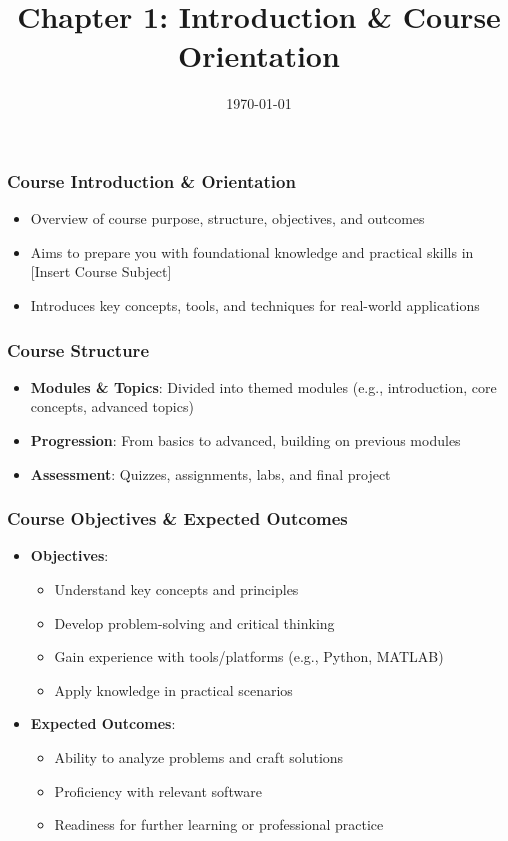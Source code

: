 \documentclass{beamer}
\title{Chapter 1: Introduction \& Course Orientation}
\author{}
\institute{}
\date{\today}
\begin{document}
\frame{\titlepage}

\begin{frame}[fragile]
  \frametitle{Course Introduction \& Orientation}
  \begin{itemize}
    \item Overview of course purpose, structure, objectives, and outcomes
    \item Aims to prepare you with foundational knowledge and practical skills in [Insert Course Subject]
    \item Introduces key concepts, tools, and techniques for real-world applications
  \end{itemize}
\end{frame}

\begin{frame}[fragile]
  \frametitle{Course Structure}
  \begin{itemize}
    \item \textbf{Modules \& Topics}: Divided into themed modules (e.g., introduction, core concepts, advanced topics)
    \item \textbf{Progression}: From basics to advanced, building on previous modules
    \item \textbf{Assessment}: Quizzes, assignments, labs, and final project
  \end{itemize}
\end{frame}

\begin{frame}[fragile]
  \frametitle{Course Objectives \& Expected Outcomes}
  \begin{itemize}
    \item \textbf{Objectives}: 
      \begin{itemize}
        \item Understand key concepts and principles
        \item Develop problem-solving and critical thinking
        \item Gain experience with tools/platforms (e.g., Python, MATLAB)
        \item Apply knowledge in practical scenarios
      \end{itemize}
    \item \textbf{Expected Outcomes}:
      \begin{itemize}
        \item Ability to analyze problems and craft solutions
        \item Proficiency with relevant software
        \item Readiness for further learning or professional practice
      \end{itemize}
  \end{itemize}
\end{frame}
\end{document}
